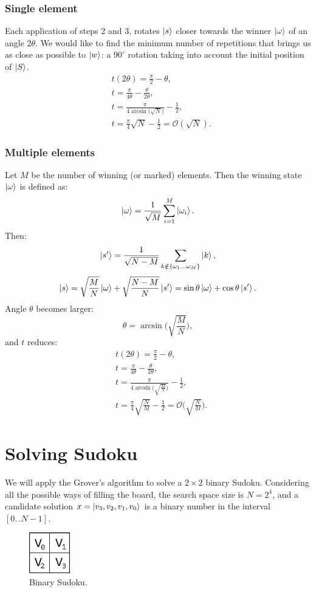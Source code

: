 \documentclass{article}
\newcommand*{\twodots}{\mathrel{. \, .}}
\begin{document}
\subsubsection{Single element}
Each application of steps 2 and 3, rotates $\ket{s}$
closer towards the winner $\ket{\omega}$ of an angle $2 \theta$.
We would like to find the minimum number of repetitions that brings us as close
as possible to $\ket{w}$: a $90^\circ$ rotation taking into account the initial
position of $\ket{S}$.
\begin{align*}
  & t(2 \theta) = \frac{\pi}{2} - \theta, \\
  & t = \frac{\pi}{4 \theta} - \frac{\theta}{2\theta}, \\
  & t = \frac{\pi}{4 \arcsin \bigl( {\sqrt{N} } \bigr) } - \frac{1}{2},\\
  & t = \frac{\pi}{4} \sqrt{N} - \frac{1}{2} =
  \mathcal O(\sqrt{N}).
\end{align*}

\subsubsection{Multiple elements}
Let $M$ be the number of winning (or marked) elements.
Then the winning state $\ket{\omega}$ is defined as:
\[
  \ket{\omega} = \frac{1}{\sqrt{M}} \sum_{i = 1}^{M} \ket{\omega_i}.
\]
Then:
  \[
    \ket{s'} =
    \frac{1}{\sqrt{N-M}} \sum_{k \notin \{ \omega_1 \ldots \omega_M \}} \ket{k},
  \]
  \[
    \ket{s} =
    \sqrt{\frac{M}{N}} \ket{\omega} + \sqrt{\frac{N-M}{N}} \ket{s'}
    = \sin\theta \ket{\omega} + \cos{\theta} \ket{s'}.
  \]
Angle $\theta$ becomes larger:
\[
  \theta = \arcsin \bigl( \sqrt{\frac{M}{N}} \bigr),
\]
and $t$ reduces:
\begin{align*}
  & t(2 \theta) = \frac{\pi}{2} - \theta, \\
  & t = \frac{\pi}{4 \theta} - \frac{\theta}{2\theta}, \\
  & t = \frac{\pi}{4 \arcsin \bigl( \sqrt{\frac{M}{N}} \bigr) } - \frac{1}{2},\\
  & t = \frac{\pi}{4} \sqrt{\frac{N}{M}} - \frac{1}{2}
    = \mathcal O\biggl(\sqrt{\frac{N}{M}}\biggr).
\end{align*}

\newpage
\section{Solving Sudoku}
We will apply the Grover's algorithm to solve a $2 \times 2$ binary Sudoku.
Considering all the possible ways of filling the board, the search space size
is $N = 2^{4}$, and a candidate solution $x = \ket{v_3, v_2,
  v_1, v_0}$ is a binary number in the interval $[0 \twodots N-1]$.
\begin{figure}[H]
  \centering
  \includegraphics[width=50pt]{Img/binary-sudoku.png}
  \caption{Binary Sudoku.}
\end{figure}
\end{document}

